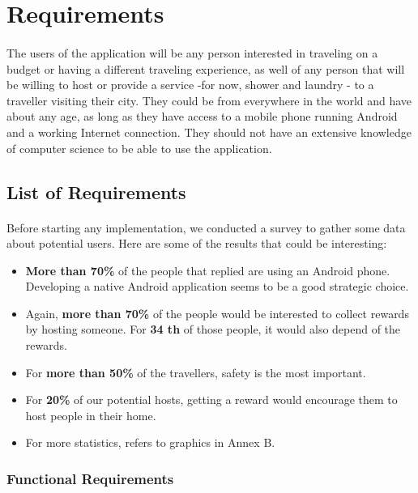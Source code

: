 \documentclass[paper=a4, fontsize=12pt,DIV=14]{scrartcl}    %
\begin{document}
    \newpage
        \section{Requirements}
        	\paragraph{}The users of the application will be any person interested in traveling on a budget or having a different traveling experience, as well of any person that will be willing to host or provide a service -for now, shower and laundry - to a traveller visiting their city. They could be from everywhere in the world and have about any age, as long as they have access to a mobile phone running Android and a working Internet connection. They should not have an extensive knowledge of computer science to be able to use the application.
        	\subsection{List of Requirements}
        		\paragraph{}Before starting any implementation, we conducted a survey to gather some data about potential users. Here are some of the results that could be interesting:
        		\begin{itemize}
        			\item \textbf{More than 70\%} of the people that replied are using an Android phone. Developing a native Android application seems to be a good strategic choice.
        			\item Again, \textbf{more than 70\%} of the people would be interested to collect rewards by hosting someone. For \textbf{3\/4 th} of those people, it would also depend of the rewards.
        			\item For \textbf{more than 50\% }of the travellers, safety is the most important.
        			\item For \textbf{20\% }of our potential hosts, getting a reward would encourage them to host people in their home.
        			\item For more statistics, refers to graphics in Annex B.
        		\end{itemize}
    \newpage
        		\subsubsection{Functional Requirements}
\end{document}
